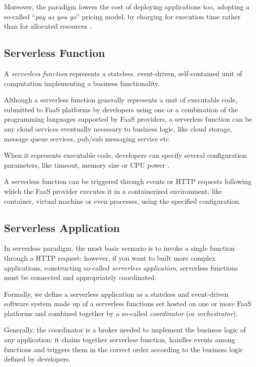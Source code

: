 Moreover, the paradigm lowers the cost of deploying applications too, adopting a so-called “\textit{pay as you go}” pricing model, by charging for execution time rather than for allocated resources \cite{COSE}.


\subsection{Serverless Function}

A \textit{serverless function} represents a stateless, event-driven, self-contained unit of computation implementing a business functionality.

Although a serverless function generally represents a unit of executable code, submitted to FaaS platforms by developers using one or a combination of the programming languages supported by FaaS providers, a serverless function can be any cloud services eventually necessary to business logic, like cloud storage, message queue services, pub/sub messaging service etc.

When it represents executable code, developers can specify several configuration parameters, like timeout, memory size or CPU power \cite{COSE}.

A serverless function can be triggered through events or HTTP requests following which the FaaS provider executes it in a containerized environment, like container, virtual machine or even processes, using the specified configuration.

\subsection{Serverless Application}

In serverless paradigm, the most basic scenario is to invoke a single function through a HTTP request; however, if you want to built more complex applications, constructing so-called \textit{serverless application}, serverless functions must be connected and appropriately coordinated.

Formally, we define a serverless application as a stateless and event-driven software system made up of a serverless functions set hosted on one or more FaaS platforms and combined together by a so-called \textit{coordinator} (or \textit{orchestrator}).

Generally, the coordinator is a broker needed to implement the business logic of any application: it chains together serverless function, handles events among functions and triggers them in the correct order according to the business logic defined by developers. 

